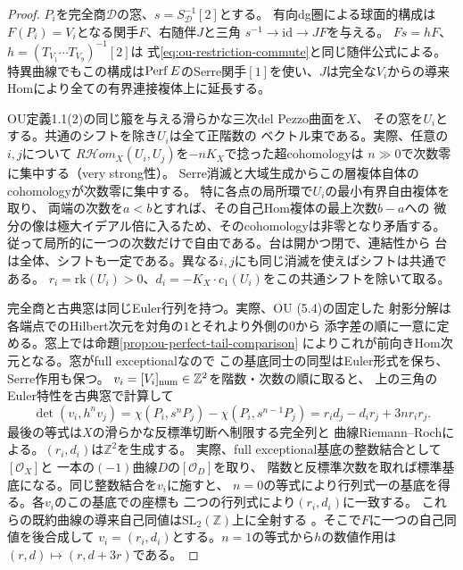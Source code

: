 \begin{proof}
$P_i$を完全商$\mathcal D$の窓、$s=S_{\mathcal D}^{-1}[2]$とする。
有向dg圏による球面的構成\cite[(3)--(5)]{OUSpherical2020}は
$F(P_i)=V_i$となる関手$F$、右随伴$J$と三角
$s^{-1}\to\mathrm{id}\to JF$を与える。
$Fs=hF$、$h=(T_{V_1}\cdots T_{V_9})^{-1}[2]$は
式\eqref{eq:ou-restriction-commute}と同じ随伴公式による。特異曲線でもこの構成は\(\operatorname{Perf} E\)のSerre関手$[1]$を使い、$J$は完全な$V_i$からの導来Homにより全ての有界連接複体上に延長する。

OU定義1.1(2)の同じ箙を与える滑らかな三次del Pezzo曲面を$X$、
その窓を$U_i$とする。共通のシフトを除き$U_i$は全て正階数の
ベクトル束である。実際、任意の$i,j$について
$R\mathcal H om_X(U_i,U_j)$を$-nK_X$で捻った超cohomologyは
$n\gg0$で次数零に集中する（very strong性）。
Serre消滅と大域生成からこの層複体自体のcohomologyが次数零に集中する。
特に各点の局所環で$U_i$の最小有界自由複体を取り、
両端の次数を$a<b$とすれば、その自己Hom複体の最上次数$b-a$への
微分の像は極大イデアル倍に入るため、そのcohomologyは非零となり矛盾する。
従って局所的に一つの次数だけで自由である。台は開かつ閉で、連結性から
台は全体、シフトも一定である。異なる$i,j$にも同じ消滅を使えばシフトは共通である。
$r_i=\mathrm{rk}(U_i)>0$、$d_i=-K_X\cdot c_1(U_i)$をこの共通シフトを除いて取る。

完全商と古典窓は同じEuler行列を持つ。実際、OU (5.4)の固定した
射影分解は各端点でのHilbert次元を対角の$1$とそれより外側の$0$から
添字差の順に一意に定める。窓上では命題\ref{prop:ou-perfect-tail-comparison}
によりこれが前向きHom次元となる。窓がfull exceptionalなので
この基底同士の同型はEuler形式を保ち、Serre作用も保つ。
$v_i=[V_i]_{\rm num}\in\mathbb Z^2$を階数・次数の順に取ると、
上の三角のEuler特性を古典窓で計算して
\[
 \det(v_i,h^n v_j)
  =\chi(P_i,s^nP_j)-\chi(P_i,s^{n-1}P_j)
  =r_i d_j-d_i r_j+3n r_i r_j .
\]
最後の等式は$X$の滑らかな反標準切断へ制限する完全列と
曲線Riemann--Rochによる。$(r_i,d_i)$は$\mathbb Z^2$を生成する。
実際、full exceptional基底の整数結合として$[\mathcal O_X]$と
一本の$(-1)$曲線$D$の$[\mathcal O_D]$を取り、
階数と反標準次数を取れば標準基底になる。同じ整数結合を$v_i$に施すと、
$n=0$の等式により行列式一の基底を得る。各$v_i$のこの基底での座標も
二つの行列式により$(r_i,d_i)$に一致する。
これらの既約曲線の導来自己同値は$\mathrm{SL}_2(\mathbb Z)$上に全射する
\cite[Corollary~5.8]{BurbanKreu2006}。そこで$F$に一つの自己同値を後合成して
$v_i=(r_i,d_i)$とする。$n=1$の等式から$h$の数値作用は
$(r,d)\mapsto(r,d+3r)$である。


\end{proof}
